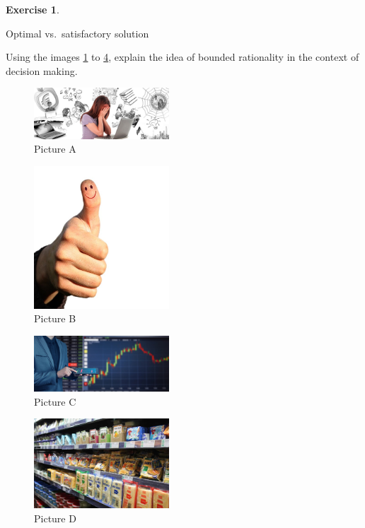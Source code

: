 \documentclass[
  12pt,
  oneside]{book}
\theoremstyle{definition}
\theoremstyle{definition}
\theoremstyle{definition}
\newtheorem{exercise}{Exercise}[chapter]
\theoremstyle{definition}
\theoremstyle{remark}
\begin{document}
\begin{exercise}
\protect\hypertarget{exr:opti-sati}{}\label{exr:opti-sati}

Optimal vs.~satisfactory solution

Using the images \ref{fig:picA} to \ref{fig:picD}, explain the idea of bounded rationality in the context of decision making.

\begin{figure}
\centering
\includegraphics[width=0.45\textwidth,height=\textheight]{fig/seeking.jpg}
\caption{\label{fig:picA} Picture A}
\end{figure}

\begin{figure}
\centering
\includegraphics[width=0.45\textwidth,height=\textheight]{fig/thumb.jpg}
\caption{\label{fig:picB} Picture B}
\end{figure}

\begin{figure}
\centering
\includegraphics[width=0.45\textwidth,height=\textheight]{fig/stock.jpg}
\caption{\label{fig:picC} Picture C}
\end{figure}

\begin{figure}
\centering
\includegraphics[width=0.45\textwidth,height=\textheight]{fig/supermarket.jpg}
\caption{\label{fig:picD} Picture D}
\end{figure}


\end{exercise}
\end{document}
